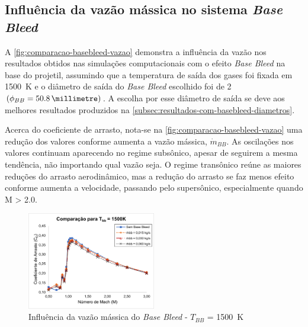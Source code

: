 \subsection{Influência da vazão mássica no sistema \textit{Base Bleed}} \label{subsec:resultados-com-basebleed-vazao}

A \autoref{fig:comparacao-basebleed-vazao} demonstra a influência da vazão nos resultados obtidos nas simulações computacionais com o efeito \textit{Base Bleed} na base do projetil, assumindo que a temperatura de saída dos gases foi fixada em \qty{1500}{\kelvin} e o diâmetro de saída do \textit{Base Bleed} escolhido foi de \qty{2}{\polegada} \(\left(\phi_{BB} = \qty{50,8}{\millimetre}\right)\). A escolha por esse diâmetro de saída se deve aos melhores resultados produzidos na \autoref{subsec:resultados-com-basebleed-diametros}.

Acerca do coeficiente de arrasto, nota-se na \autoref{fig:comparacao-basebleed-vazao} uma redução dos valores conforme aumenta a vazão mássica, \(\Dot{m}_{BB}\). As oscilações nos valores continuam aparecendo no regime subsônico, apesar de seguirem a mesma tendência, não importando qual vazão seja. O regime transônico reúne as maiores reduções do arrasto aerodinâmico, mas a redução do arrasto se faz menos efeito conforme aumenta a velocidade, passando pelo supersônico, especialmente quando M > \num{2,0}.

\begin{figure}[!ht]
	\centering
	\includegraphics[width=0.5\textwidth]{cd-combasebleed-1500K-2pol.png}
	\caption{Influência da vazão mássica do \textit{Base Bleed} - \(T_{BB}\) = \qty{1500}{\kelvin}}
	\label{fig:comparacao-basebleed-vazao}
\end{figure}

